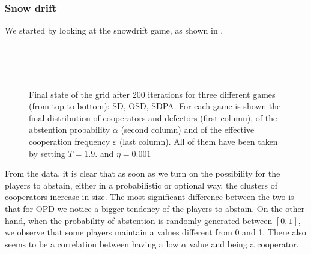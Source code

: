 \documentclass[12pt,oneside,a4paper,fleqn]{article}
\begin{document}
\subsubsection{Snow drift}
We started by looking at the snowdrift game, as shown in .
\begin{figure}
    \centering
     \\
     \\
     \\
    \caption{Final state of the grid after 200 iterations for three different games (from top to bottom): SD, OSD, SDPA. For each game is shown the final distribution of cooperators and defectors (first column), of the abstention probability $\alpha$ (second column) and of the effective cooperation frequency $\varepsilon$ (last column). All of them have been taken by setting $T = 1.9$. and $\eta = 0.001$}
    \label{fig: screenshots of SD OSD SDPA}
\end{figure}
From the data, it is clear that as soon as we turn on the possibility for the players to abstain, either in a probabilistic or optional way, the clusters of cooperators increase in size.
The most significant difference between the two is that for OPD we notice a bigger tendency of the players to abstain.
On the other hand, when the probability of abstention is randomly generated between $[0,1]$, we observe that some players maintain a values different from 0 and 1.
There also seems to be a correlation between having a low $\alpha$ value and being a cooperator.
\end{document}
